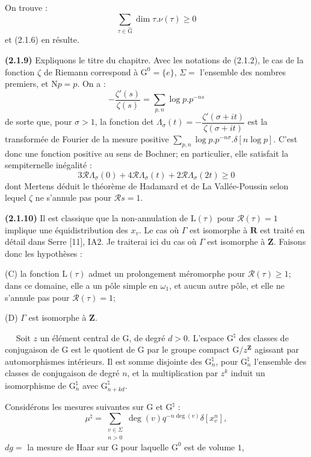\documentclass[11pt,leqno]{article}
\newcommand{\Page}[1]{\ifvmode\noindent\else\unskip\ \fi{\footnotesize\textcolor{gray}{[p.\,#1]}}\ \ignorespaces}
\begin{document}
On trouve :
\[
\sum_{\tau\in\widehat{\mathrm{G}}}\dim\tau.\nu(\tau)\geq0
\]
et (2.1.6) en résulte.

\textbf{(2.1.9)} Expliquons le titre du chapitre. Avec les notations de (2.1.2), le cas de la fonction \(\zeta\) de Riemann correspond à \(\mathrm{G}^0=\{e\}\), \(\Sigma=\) l’ensemble des nombres premiers, et \(\mathrm{N}p=p\). On a :
\[
-\frac{\zeta'(s)}{\zeta(s)}
 =\sum_{p,n}\log p.p^{-ns}
\]
de sorte que, pour \(\sigma>1\), la fonction det \(\Lambda_\sigma(t)=-\dfrac{\zeta'(\sigma+it)}{\zeta(\sigma+it)}\) est la transformée de Fourier de la mesure positive \(\displaystyle\sum_{p,n}\log p.p^{-n\sigma}.\delta[n\log p]\). C’est donc une fonction positive au sens de Bochner; en particulier, elle satisfait la sempiternelle inégalité :
\[
3\mathscr{R}\Lambda_\sigma(0)
 +4\mathscr{R}\Lambda_\sigma(t)
 +2\mathscr{R}\Lambda_\sigma(2t)\geq0
\]
dont Mertens déduit le théorème de Hadamard et de La Vallée-Poussin selon lequel \(\zeta\) ne s’annule pas pour \(\mathscr{R}s=1\).

\textbf{(2.1.10)} Il est classique que la non-annulation de \(\mathrm{L}(\tau)\) pour \(\mathscr{R}(\tau)=1\) implique une équidistribution des \(x_v\). Le cas où \(\Gamma\) est isomorphe à \(\mathbf{R}\) est traité en détail dans Serre [11], IA2. Je traiterai ici du cas où \(\Gamma\) est isomorphe à \(\mathbf{Z}\). Faisons donc les hypothèses :

\noindent (C) la fonction \(\mathrm{L}(\tau)\) admet un prolongement méromorphe pour \(\mathscr{R}(\tau)\geq1\); dans ce domaine, elle a un pôle simple en \(\omega_1\), et aucun autre pôle, et elle ne s’annule pas pour \(\mathscr{R}(\tau)=1\);

\noindent (D) \(\Gamma\) est isomorphe à \(\mathbf{Z}\).

\Page{192}
Soit \(z\) un élément central de \(\mathrm{G}\), de degré \(d>0\). L’espace \(\mathrm{G}^{\natural}\) des classes de conjugaison de \(\mathrm{G}\) est le quotient de \(\mathrm{G}\) par le groupe compact \(\mathrm{G}/z^{\mathbf{Z}}\) agissant par automorphismes intérieurs. Il est somme disjointe des \(\mathrm{G}_n^{\natural}\), pour \(\mathrm{G}_n^{\natural}\) l’ensemble des classes de conjugaison de degré \(n\), et la multiplication par \(z^k\) induit un isomorphisme de \(\mathrm{G}_n^{\natural}\) avec \(\mathrm{G}_{n+kd}^{\natural}\).

Considérons les mesures suivantes sur \(\mathrm{G}\) et \(\mathrm{G}^{\natural}\) :
\[
\mu^{\natural}
 =\sum_{\substack{v\in\Sigma\\ n>0}}
   \deg(v)q^{-n\deg(v)}\delta[x_v^n],
\]
\noindent \(dg=\) la mesure de Haar sur \(\mathrm{G}\) pour laquelle \(\mathrm{G}^0\) est de volume \(1\),
\end{document}
